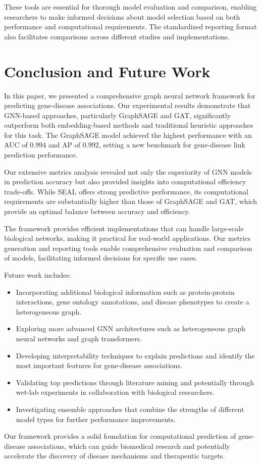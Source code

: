 \documentclass[conference]{IEEEtran}
\begin{document}
These tools are essential for thorough model evaluation and comparison, enabling researchers to make informed decisions about model selection based on both performance and computational requirements. The standardized reporting format also facilitates comparisons across different studies and implementations.

\section{Conclusion and Future Work}
In this paper, we presented a comprehensive graph neural network framework for predicting gene-disease associations. Our experimental results demonstrate that GNN-based approaches, particularly GraphSAGE and GAT, significantly outperform both embedding-based methods and traditional heuristic approaches for this task. The GraphSAGE model achieved the highest performance with an AUC of 0.994 and AP of 0.992, setting a new benchmark for gene-disease link prediction performance.

Our extensive metrics analysis revealed not only the superiority of GNN models in prediction accuracy but also provided insights into computational efficiency trade-offs. While SEAL offers strong predictive performance, its computational requirements are substantially higher than those of GraphSAGE and GAT, which provide an optimal balance between accuracy and efficiency.

The framework provides efficient implementations that can handle large-scale biological networks, making it practical for real-world applications. Our metrics generation and reporting tools enable comprehensive evaluation and comparison of models, facilitating informed decisions for specific use cases.

Future work includes:
\begin{itemize}
\item Incorporating additional biological information such as protein-protein interactions, gene ontology annotations, and disease phenotypes to create a heterogeneous graph.
\item Exploring more advanced GNN architectures such as heterogeneous graph neural networks \cite{wang2019heterogeneous} and graph transformers.
\item Developing interpretability techniques to explain predictions and identify the most important features for gene-disease associations.
\item Validating top predictions through literature mining and potentially through wet-lab experiments in collaboration with biological researchers.
\item Investigating ensemble approaches that combine the strengths of different model types for further performance improvements.
\end{itemize}

Our framework provides a solid foundation for computational prediction of gene-disease associations, which can guide biomedical research and potentially accelerate the discovery of disease mechanisms and therapeutic targets.



\end{document}
